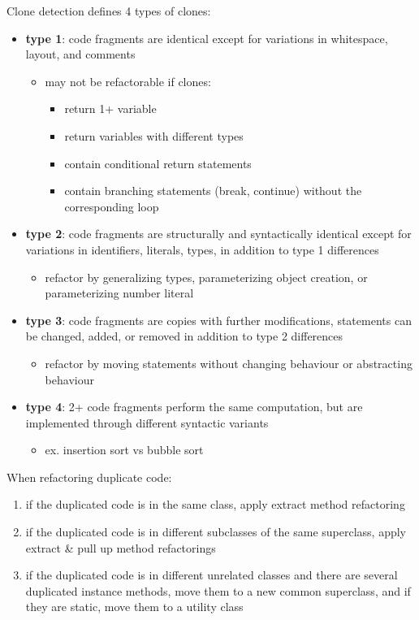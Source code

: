 \documentclass[11pt]{article}
\begin{document}
Clone detection defines 4 types of clones:
\begin{itemize}
\item \textbf{type 1}: code fragments are identical except for variations in whitespace, layout, and comments
\begin{itemize}
\item may not be refactorable if clones:
\begin{itemize}
\item return 1+ variable
\item return variables with different types
\item contain conditional return statements
\item contain branching statements (break, continue) without the corresponding loop
\end{itemize}
\end{itemize}
\item \textbf{type 2}: code fragments are structurally and syntactically identical except for variations in
identifiers, literals, types, in addition to type 1 differences
\begin{itemize}
\item refactor by generalizing types, parameterizing object creation, or parameterizing number literal
\end{itemize}
\item \textbf{type 3}: code fragments are copies with further modifications, statements can be changed, added,
or removed in addition to type 2 differences
\begin{itemize}
\item refactor by moving statements without changing behaviour or abstracting behaviour
\end{itemize}
\item \textbf{type 4}: 2+ code fragments perform the same computation, but are implemented through different
syntactic variants
\begin{itemize}
\item ex. insertion sort vs bubble sort
\end{itemize}
\end{itemize}

When refactoring duplicate code:
\begin{enumerate}
\item if the duplicated code is in the same class, apply extract method refactoring
\item if the duplicated code is in different subclasses of the same superclass, apply extract \& pull up
method refactorings
\item if the duplicated code is in different unrelated classes and there are several duplicated
instance methods, move them to a new common superclass, and if they are static, move them to a
utility class
\end{enumerate}
\end{document}
